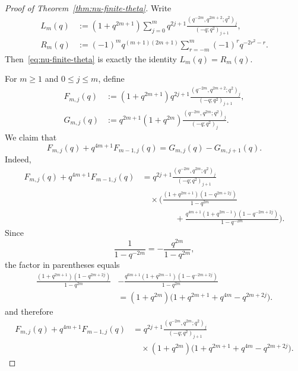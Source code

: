 \documentclass[10pt,a4paper]{amsart}
\begin{document}
\begin{proof}[Proof of Theorem~\ref{thm:nu-finite-theta}]
Write
\begin{align*}
L_m(q)&:=(1+q^{2m+1})\sum_{j=0}^{m} q^{2j+1}
\frac{(q^{-2m},q^{2m+2};q^2)_j}{(-q;q^2)_{j+1}},\\
R_m(q)&:=(-1)^m q^{(m+1)(2m+1)}
\sum_{r=-m}^{m} (-1)^r q^{-2r^2-r}.
\end{align*}
Then~\eqref{eq:nu-finite-theta} is exactly the identity $L_m(q)=R_m(q)$.

For $m\ge 1$ and $0\le j\le m$, define
\begin{align*}
F_{m,j}(q)&:=(1+q^{2m+1})q^{2j+1}
\frac{(q^{-2m},q^{2m+2};q^2)_j}{(-q;q^2)_{j+1}},\\
G_{m,j}(q)&:=q^{2m+1}(1+q^{2m})
\frac{(q^{-2m},q^{2m};q^2)_j}{(-q;q^2)_j}.
\end{align*}
We claim that
\begin{equation}\label{eq:nu-telescope}
F_{m,j}(q)+q^{4m+1}F_{m-1,j}(q)=G_{m,j}(q)-G_{m,j+1}(q).
\end{equation}
Indeed,
\begin{align*}
F_{m,j}(q)+q^{4m+1}F_{m-1,j}(q)
&=
q^{2j+1}\frac{(q^{-2m},q^{2m};q^2)_j}{(-q;q^2)_{j+1}}\\
&\quad\times\Biggl(
\frac{(1+q^{2m+1})(1-q^{2m+2j})}{1-q^{2m}}\\
&\qquad\qquad
+\frac{q^{4m+1}(1+q^{2m-1})(1-q^{-2m+2j})}{1-q^{-2m}}
\Biggr).
\end{align*}
Since
\[
\frac{1}{1-q^{-2m}}=-\frac{q^{2m}}{1-q^{2m}},
\]
the factor in parentheses equals
\[
\begin{aligned}
\frac{(1+q^{2m+1})(1-q^{2m+2j})}{1-q^{2m}}
&- \frac{q^{6m+1}(1+q^{2m-1})(1-q^{-2m+2j})}{1-q^{2m}}\\
&= (1+q^{2m})\bigl(1+q^{2m+1}+q^{4m}-q^{2m+2j}\bigr).
\end{aligned}
\]
and therefore
\begin{equation}\label{eq:nu-left-common}
\begin{aligned}
F_{m,j}(q)+q^{4m+1}F_{m-1,j}(q)
&=
q^{2j+1}\frac{(q^{-2m},q^{2m};q^2)_j}{(-q;q^2)_{j+1}}\\
&\quad\times(1+q^{2m})\bigl(1+q^{2m+1}+q^{4m}-q^{2m+2j}\bigr).
\end{aligned}
\end{equation}


\end{proof}
\end{document}
